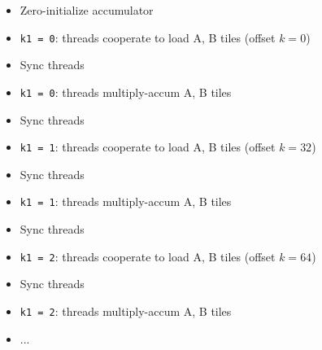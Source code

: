 \begin{minipage}[t]{0.48\textwidth}\fixminipage
\begin{itemize}
  \item Zero-initialize accumulator
  \item \texttt{k1 = 0}: threads cooperate to load A, B tiles (offset $k = 0$)
  \item Sync threads
  \item \texttt{k1 = 0}: threads multiply-accum A, B tiles
  \item Sync threads
  \item \texttt{k1 = 1}: threads cooperate to load A, B tiles (offset $k = 32$)
  \item Sync threads
  \item \texttt{k1 = 1}: threads multiply-accum A, B tiles
  \item Sync threads
  \item \texttt{k1 = 2}: threads cooperate to load A, B tiles (offset $k = 64$)
  \item Sync threads
  \item \texttt{k1 = 2}: threads multiply-accum A, B tiles
  \item ...
\end{itemize}
\end{minipage}
\hfill
